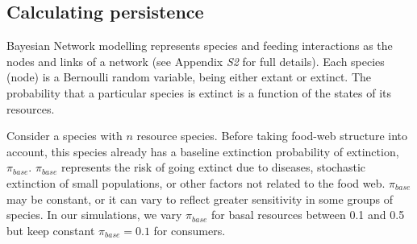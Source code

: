 \documentclass[12pt]{article}
\begin{document}
\begin{spacing}{2.0}
		
		
	\subsection*{Calculating persistence}	
        Bayesian Network modelling represents species and feeding interactions as the nodes and links of a network (see Appendix \emph{S2} for full details).
        Each species (node) is a Bernoulli random variable, being either extant or extinct. 
        The probability that a particular species is extinct is a function of the states of its resources.
        
  
		Consider a species with $n$ resource species. 
		Before taking food-web structure into account, this species already has a baseline extinction  probability of extinction, $\pi_{base}$. 
		$\pi_{base}$ represents the risk of going extinct due to diseases, stochastic extinction of small populations, or other factors not related to the food web.
		$\pi_{base}$ may be constant, or it can vary to reflect greater sensitivity in some groups of species.
		In our simulations, we vary $\pi_{base}$ for basal resources between 0.1 and 0.5 but keep constant $\pi_{base}=0.1$ for consumers.
		


\end{spacing}
\end{document}
